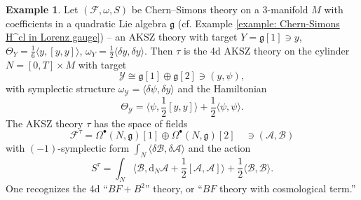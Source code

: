\documentclass{amsart}
\theoremstyle{plain} %
\theoremstyle{definition}
\newtheorem{expl}[thm]{Example}
\theoremstyle{remark}
\newcommand{\g}{\mathfrak{g}}
\newcommand{\mc}{\mathcal}
\newcommand{\bt}{\bullet}
\newcommand{\F}{\mathcal{F}}
\newcommand{\A}{\mathcal{A}}
\newcommand{\B}{\mathcal{B}}
\newcommand{\dr}{\mathrm{d}}
\begin{document}
\begin{expl}
Let $(\F,\omega,S)$ be Chern--Simons theory on a 3-manifold $M$ with coefficients in a quadratic Lie algebra $\g$ (cf. Example \ref{example: Chern-Simons H^cl in Lorenz gauge}) -- an AKSZ theory with target $Y=\g[1]\ni y$, $\Theta_Y=\frac16\langle y,[y,y] \rangle$, $\omega_Y=\frac12\langle \delta y,\delta y \rangle$. Then $\tau$ is the 4d AKSZ theory on the cylinder $N=[0,T]\times M$ with target
\begin{equation}
\mc{Y}\cong \g[1]\oplus \g[2]\ni (y,\psi),
\end{equation}
with symplectic structure $\omega_\mc{Y}=\langle \delta\psi,\delta y\rangle$ and the Hamiltonian 
\begin{equation}
\Theta_\mc{Y}=\langle \psi,\frac12[y,y] \rangle+\frac12 \langle \psi,\psi \rangle.
\end{equation}
The AKSZ theory $\tau$ has the space of fields
\begin{equation}
    \F^\tau=\Omega^\bt(N,\g)[1]\oplus \Omega^\bt(N,\g)[2]\quad \ni (\A,\B)
\end{equation}
with $(-1)$-symplectic form $\int_N \langle \delta\B,\delta \A \rangle$ and the action
\begin{equation}
    S^\tau=\int_N \langle \B,\dr_N\A+\frac12[\A,\A] \rangle + \frac12 \langle \B,\B\rangle.
\end{equation}
One recognizes the 4d ``$BF+B^2$'' theory, or ``$BF$ theory with cosmological term.''
\end{expl}
\end{document}
